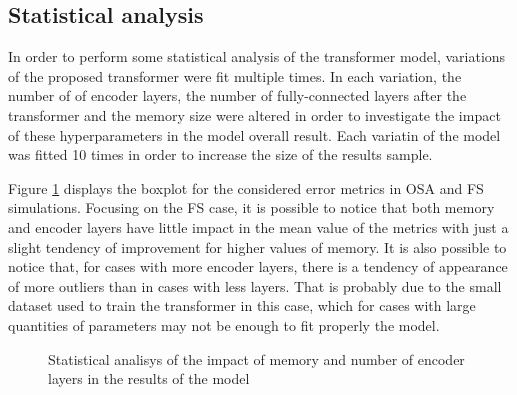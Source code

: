\documentclass[conference]{IEEEtran}
\begin{document}
\subsection{Statistical analysis}

In order to perform some statistical analysis of the transformer model, variations of the proposed transformer were fit multiple times. In each variation, the number of
of encoder layers, the number of fully-connected layers after the transformer and the memory size were altered in order to investigate the impact of these hyperparameters
in the model overall result. Each variatin of the model was fitted 10 times in order to increase the size of the results sample. 

Figure \ref{fig:boxplot_results} displays the boxplot for the considered error metrics in OSA and FS simulations.
Focusing on the FS case, it is possible to notice that both memory and encoder layers have little impact in the mean value
of the metrics with just a slight tendency of improvement for higher values of memory. It is also possible to notice that, 
for cases with more encoder layers, there is a tendency of appearance
of more outliers than in cases with less layers. That is probably due to the small dataset used to train the transformer in this case,
which for cases with large quantities of parameters may not be enough to fit properly the model.

\begin{figure}[htbp]
    \centering
    \hfil
    \hfil
    \caption{Statistical analisys of the impact of memory and number of encoder layers in the results of the model}
    \label{fig:boxplot_results}
\end{figure}
\end{document}
